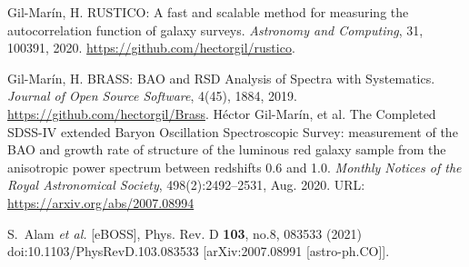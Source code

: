 \begin{thebibliography}{999}
 Gil-Marín, H. RUSTICO: A fast and scalable method for measuring the autocorrelation function of galaxy surveys. \textit{Astronomy and Computing}, 31, 100391, 2020. \url{https://github.com/hectorgil/rustico}.

 Gil-Marín, H. BRASS: BAO and RSD Analysis of Spectra with Systematics. \textit{Journal of Open Source Software}, 4(45), 1884, 2019. \url{https://github.com/hectorgil/Brass}.
Héctor Gil-Marín, et al.
\newblock The Completed {SDSS}-{IV} extended Baryon Oscillation Spectroscopic Survey: measurement of the {BAO} and growth rate of structure of the luminous red galaxy sample from the anisotropic power spectrum between redshifts 0.6 and 1.0.
\newblock \emph{Monthly Notices of the Royal Astronomical Society}, 498(2):2492--2531, Aug. 2020.
\newblock URL: \url{https://arxiv.org/abs/2007.08994}



S.~Alam \textit{et al.} [eBOSS],
Phys. Rev. D \textbf{103}, no.8, 083533 (2021)
doi:10.1103/PhysRevD.103.083533
[arXiv:2007.08991 [astro-ph.CO]].

\end{thebibliography}
